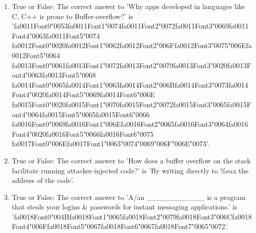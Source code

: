 \documentclass[12pt]{article}
\begin{document}
\begin{enumerate}[label=\arabic*.]
\item True or False: The correct answer to 'Why apps developed in languages like C, C++ is prone to Buffer-overflow?' is '{\csname fa0011Font0\endcsname\char"0053}{\csname fa0011Font1\endcsname\char"0074}{\csname fa0011Font2\endcsname\char"0072}{\csname fa0011Font3\endcsname\char"0069}{\csname fa0011Font4\endcsname\char"0063}{\csname fa0011Font5\endcsname\char"0074} {\csname fa0012Font0\endcsname\char"0020}{\csname fa0012Font1\endcsname\char"0062}{\csname fa0012Font2\endcsname\char"006F}{\csname fa0012Font3\endcsname\char"0075}{\char"006E}{\csname fa0012Font5\endcsname\char"0064} {\csname fa0013Font0\endcsname\char"0061}{\csname fa0013Font1\endcsname\char"0072}{\csname fa0013Font2\endcsname\char"0079}{\csname fa0013Font3\endcsname\char"0020}{\csname fa0013Font4\endcsname\char"0063}{\csname fa0013Font5\endcsname\char"0068} {\csname fa0014Font0\endcsname\char"0065}{\csname fa0014Font1\endcsname\char"0063}{\csname fa0014Font2\endcsname\char"006B}{\csname fa0014Font3\endcsname\char"0073}{\csname fa0014Font4\endcsname\char"0020}{\csname fa0014Font5\endcsname\char"0069}{\csname fa0014Font6\endcsname\char"006E} {\csname fa0015Font0\endcsname\char"0020}{\csname fa0015Font1\endcsname\char"0070}{\csname fa0015Font2\endcsname\char"0072}{\csname fa0015Font3\endcsname\char"0065}{\csname fa0015Font4\endcsname\char"0064}{\csname fa0015Font5\endcsname\char"0065}{\csname fa0015Font6\endcsname\char"0066} {\csname fa0016Font0\endcsname\char"0069}{\csname fa0016Font1\endcsname\char"006E}{\csname fa0016Font2\endcsname\char"0065}{\csname fa0016Font3\endcsname\char"0064}{\csname fa0016Font4\endcsname\char"0020}{\csname fa0016Font5\endcsname\char"0066}{\csname fa0016Font6\endcsname\char"0075} {\csname fa0017Font0\endcsname\char"006E}{\csname fa0017Font1\endcsname\char"0063}{\char"0074}{\char"0069}{\char"006F}{\char"006E}{\char"0073}'.
\item True or False: The correct answer to 'How does a buffer overflow on the stack facilitate running attacker-injected code?' is 'By writing directly to \%eax the address of the code'.
\item True or False: The correct answer to 'A/an \_\_\_\_\_\_\_\_\_\_\_ is a program that steals your logins \& passwords for instant messaging applications.' is '{\csname fa0018Font0\endcsname\char"004B}{\csname fa0018Font1\endcsname\char"0065}{\csname fa0018Font2\endcsname\char"0079}{\csname fa0018Font3\endcsname\char"006C}{\csname fa0018Font4\endcsname\char"006F}{\csname fa0018Font5\endcsname\char"0067}{\csname fa0018Font6\endcsname\char"0067}{\csname fa0018Font7\endcsname\char"0065}{\char"0072}'.

\end{enumerate}
\end{document}
